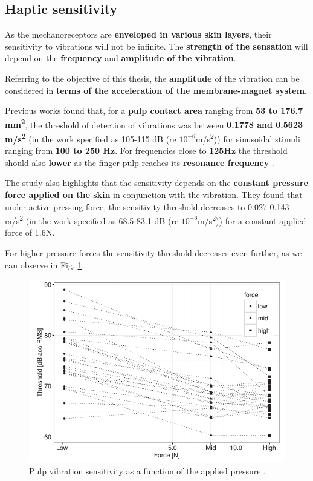 \subsection{Haptic sensitivity}
\label{Haptic sensitivity}

As the mechanoreceptors are \textbf{enveloped in various skin layers}, their sensitivity to vibrations will not be infinite. The \textbf{strength of the sensation} will depend on the \textbf{frequency} and \textbf{amplitude of the vibration}. 

Referring to the objective of this thesis, the \textbf{amplitude} of the vibration can be considered in \textbf{terms of the acceleration of the membrane-magnet system}.

Previous works \cite{Vibrotactile_Sensitivity} found that, for a \textbf{pulp contact area} ranging from \textbf{53 to 176.7 mm\textsuperscript{2}}, the threshold of detection of vibrations was between \textbf{0.1778 and 0.5623 m/s\textsuperscript{2}} (in the work specified as 105-115 dB (re $10^{-6}$m/s\textsuperscript{2})) for sinusoidal stimuli ranging from \textbf{100 to 250 Hz}. 
For frequencies close to \textbf{125Hz} the threshold should also \textbf{lower} as the finger pulp reaches its \textbf{resonance frequency} \cite{Skin_freqs_penetration}.

The study also highlights that the sensitivity depends on the \textbf{constant pressure force applied on the skin} in conjunction with the vibration.
They found that under active pressing force, the sensitivity threshold decreases to 0.027-0.143 m/s\textsuperscript{2} (in the work specified as 68.5-83.1 dB (re $10^{-6}$m/s\textsuperscript{2})) for a constant applied force of 1.6N.

\begin{samepage}
    For higher pressure forces the sensitivity threshold decreases even further, as we can observe in Fig. \ref{fig: Vibrotactile_Sensitivity}.
    \begin{figure}[H]
        \centering
        \includegraphics[width=0.5\linewidth]{Chapters/Chapter3/Haptics_Physics/Figures/vibr_thr_vs_pressure_force.png}
        \caption[Sensitivity as a function of the applied pressure.]{Pulp vibration sensitivity as a function of the applied pressure \cite{Skin_freqs_penetration}.}
        \label{fig: Vibrotactile_Sensitivity}
    \end{figure}
\end{samepage}

